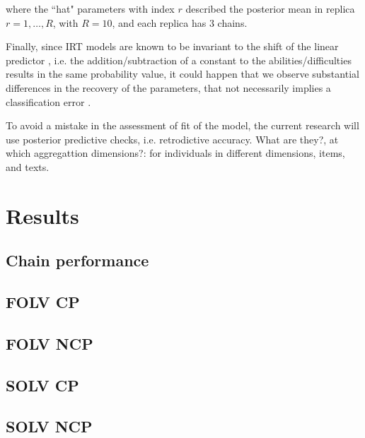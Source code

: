 \noindent where the ``hat" parameters with index $r$ described the posterior mean in replica $r=1, \dots, R$, with $R=10$, and each replica has $3$ chains.

Finally, since IRT models are known to be invariant to the shift of the linear predictor \cite{Baker_et_al_1992, Bock_1972}, i.e. the addition/subtraction of a constant to the abilities/difficulties results in the same probability value, it could happen that we observe substantial differences in the recovery of the parameters, that not necessarily implies a classification error  \cite{Wollack_2002}. 

To avoid a mistake in the assessment of fit of the model, the current research will use posterior predictive checks, i.e. retrodictive accuracy. What are they?, at which aggregattion dimensions?: for individuals in different dimensions, items, and texts.




\section{Results}

\subsection{Chain performance}


\subsection{FOLV CP}

\subsection{FOLV NCP}

\subsection{SOLV CP}

\subsection{SOLV NCP}

